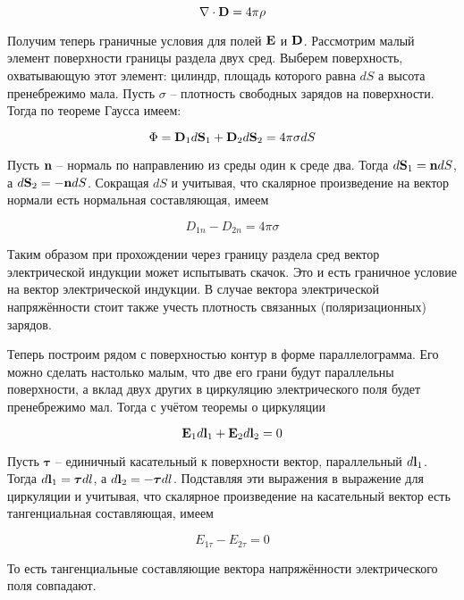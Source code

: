 \begin{equation}
    \nabla \cdot \mathbf D = 4 \pi \rho
\end{equation}

Получим теперь граничные условия для полей $\mathbf E$ и $\mathbf D$. Рассмотрим малый элемент поверхности границы раздела двух сред. Выберем поверхность, охватывающую этот элемент: цилиндр, площадь которого равна $dS$ а высота пренебрежимо мала. Пусть $\sigma$ -- плотность свободных зарядов на поверхности. Тогда по теореме Гаусса имеем:

\begin{equation*}
    \Phi = \mathbf D_1 d \mathbf S_1 + \mathbf D_2 d \mathbf S_2 = 4 \pi \sigma dS
\end{equation*}

\noindent
Пусть $\mathbf n$ -- нормаль по направлению из среды один к среде два. Тогда $d \mathbf S_1 = \mathbf n dS$, а $d \mathbf S_2 = - \mathbf n dS$. Сокращая $dS$ и учитывая, что скалярное произведение на вектор нормали есть нормальная составляющая, имеем

\begin{equation}
    D_{1n} - D_{2n} = 4 \pi \sigma
\end{equation}

Таким образом при прохождении через границу раздела сред вектор электрической индукции может испытывать скачок. Это и есть граничное условие на вектор электрической индукции. В случае вектора электрической напряжённости стоит также учесть плотность связанных (поляризационных) зарядов.

Теперь построим рядом с поверхностью контур в форме параллелограмма. Его можно сделать настолько малым, что две его грани будут параллельны поверхности, а вклад двух других в циркуляцию электрического поля будет пренебрежимо мал. Тогда с учётом теоремы о циркуляции

\begin{equation*}
    \mathbf E_1 d \mathbf l_1 + \mathbf E_2 d \mathbf l_2 = 0
\end{equation*}

\noindent
Пусть $\boldsymbol \tau$ -- единичный касательный к поверхности вектор, параллельный $d \mathbf l_1$. Тогда $d \mathbf l_1 = \boldsymbol \tau dl$, а $d \mathbf l_2 = - \boldsymbol \tau dl$. Подставляя эти выражения в выражение для циркуляции и учитывая, что скалярное произведение на касательный вектор есть тангенциальная составляющая, имеем

\begin{equation}
    E_{1 \tau} - E_{2 \tau} = 0
\end{equation}

\noindent
То есть тангенциальные составляющие вектора напряжённости электрического поля совпадают.